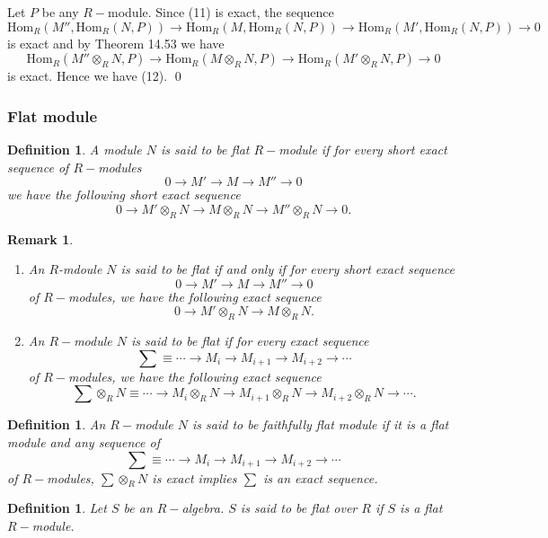 \documentclass[11pt]{amsart}
\newtheorem{defn}[theorem]{Definition}
\newtheorem{remark}[theorem]{Remark}%
\newcommand{\Hom}[1]{\text{Hom}_R\left(#1\right)}
\begin{document}
\proof Let $P$ be any $R-$module. Since (11) is exact, the sequence \begin{equation}
\Hom{M'',\Hom{N,P}}\to \Hom{M,\Hom{N,P}}\to \Hom{M',\Hom{N,P}}\to 0
\end{equation}
is exact and by Theorem 14.53 we have $$\Hom{M''\otimes_R N,P}\to \Hom{M\otimes_R N,P}\to \Hom{M'\otimes_R N,P}\to 0$$ is exact. Hence we have (12). \qed

\subsubsection{Flat module}

\begin{defn}
A module $N$ is said to be flat $R-$module if for every short exact sequence of $R-$modules $$0\to M'\to M\to M''\to 0$$ we have the following short exact sequence $$0\to M'\otimes_R N\to M\otimes_R N\to M''\otimes_R N\to 0.$$
\end{defn}

\begin{remark}
\begin{enumerate}

\item An $R$-mdoule $N$ is said to be flat if and only if for every short exact sequence $$0\to M'\to M\to M''\to 0$$ of $R-$modules, we have the following exact sequence $$0\to M'\otimes_R N\to M\otimes_R N.$$

\item An $R-$module $N$ is said to be flat if for every exact sequence $$\sum\equiv \cdots\to M_i\to M_{i+1}\to M_{i+2}\to\cdots$$ of $R-$modules, we have the following exact sequence $$\sum\otimes_R N\equiv \cdots\to M_i\otimes_R N\to M_{i+1}\otimes_R N\to M_{i+2}\otimes_R N\to\cdots.$$
\end{enumerate}
\end{remark}

\begin{defn}
An $R-$module $N$ is said to be faithfully flat module if it is a flat module and any sequence of $$\sum\equiv \cdots\to M_i\to M_{i+1}\to M_{i+2}\to\cdots$$ of $R-$modules, $\displaystyle\sum\otimes_R N$ is exact implies $\displaystyle\sum$ is an exact sequence.
\end{defn}

\begin{defn}
Let $S$ be an $R-$algebra. $S$ is said to be flat over $R$ if $S$ is a flat $R-$module.
\end{defn}
\end{document}
